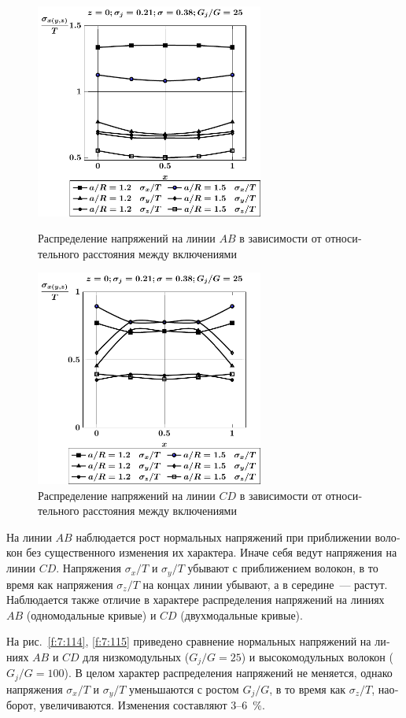 \begin{russian}
\begin{figure}[h!]
\centering\footnotesize
\parbox[b]{7.5cm}{\centering\includegraphics[width=7.5cm]{inc24-a-h10-r10-g25-z0.pdf}
\caption{Распределение напряжений на линии $AB$ в зависимости от относительного расстояния между включениями
\label{f:7:112}}}\hfil\hfil
\parbox[b]{7.5cm}{\centering\includegraphics[width=7.5cm]{inc24-a-h10-r10-g25-z0-diag.pdf}
\caption{Распределение напряжений на линии $CD$ в зависимости от относительного расстояния между включениями
\label{f:7:113}}}
\end{figure}

На линии $AB$ наблюдается рост нормальных напряжений при приближении волокон без существенного изменения их характера. Иначе себя ведут напряжения на линии $CD$. Напряжения $\sigma_x/T$ и $\sigma_y/T$ убывают с приближением волокон, в то время как напряжения $\sigma_z/T$ на концах линии убывают, а в середине~--- растут. Наблюдается также отличие в характере распределения напряжений на линиях $AB$ (одномодальные кривые) и $CD$ (двухмодальные кривые).

На рис.~\ref{f:7:114}, \ref{f:7:115} приведено сравнение нормальных напряжений на линиях $AB$ и $CD$ для низкомодульных ($G_j/G=25$) и высокомодульных волокон ($G_j/G=100$). В целом характер распределения напряжений не меняется, однако напряжения $\sigma_x/T$ и $\sigma_y/T$ уменьшаются с ростом $G_j/G$, в то время как $\sigma_z/T$, наоборот, увеличиваются. Изменения составляют 3--6~\%.


\end{russian}
